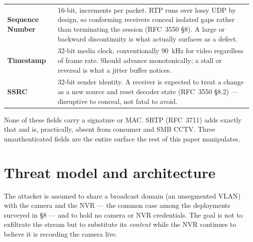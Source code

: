 \documentclass[11pt,a4paper]{article}
\begin{document}
\begin{center}
\small
\begin{tabular}{@{}p{4.1cm}p{10.6cm}@{}}
\toprule
\textbf{\textcolor{accentink}{Sequence Number}} & 16-bit, increments per packet. RTP runs over lossy UDP by design, so conforming receivers conceal isolated gaps rather than terminating the session (RFC~3550 \S8). A large or backward discontinuity is what actually surfaces as a defect. \\[4pt]
\textbf{\textcolor{accentink}{Timestamp}} & 32-bit media clock, conventionally 90~kHz for video regardless of frame rate. Should advance monotonically; a stall or reversal is what a jitter buffer notices. \\[4pt]
\textbf{\textcolor{accentink}{SSRC}} & 32-bit sender identity. A receiver is expected to treat a change as a new source and reset decoder state (RFC~3550 \S8.2) --- disruptive to conceal, not fatal to avoid. \\
\bottomrule
\end{tabular}
\end{center}

None of these fields carry a signature or MAC. SRTP (RFC~3711) adds exactly that and is, practically, absent from consumer and SMB CCTV. Three unauthenticated fields are the entire surface the rest of this paper manipulates.

\section{Threat model and architecture}
The attacker is assumed to share a broadcast domain (an unsegmented VLAN) with the camera and the NVR --- the common case among the deployments surveyed in \S8 --- and to hold no camera or NVR credentials. The goal is not to exfiltrate the stream but to substitute its \emph{content} while the NVR continues to believe it is recording the camera live.
\end{document}
